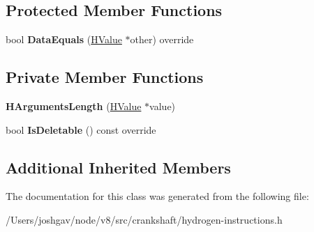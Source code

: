 \subsection*{Protected Member Functions}
\begin{DoxyCompactItemize}
\item 
bool {\bfseries Data\+Equals} (\hyperlink{classv8_1_1internal_1_1_h_value}{H\+Value} $\ast$other) override\hypertarget{classv8_1_1internal_1_1_h_arguments_length_a3ec1495f4092f8787b4fd0b66046f961}{}\label{classv8_1_1internal_1_1_h_arguments_length_a3ec1495f4092f8787b4fd0b66046f961}

\end{DoxyCompactItemize}
\subsection*{Private Member Functions}
\begin{DoxyCompactItemize}
\item 
{\bfseries H\+Arguments\+Length} (\hyperlink{classv8_1_1internal_1_1_h_value}{H\+Value} $\ast$value)\hypertarget{classv8_1_1internal_1_1_h_arguments_length_a23daaf91cbce537ffc330d3f7b3d9f16}{}\label{classv8_1_1internal_1_1_h_arguments_length_a23daaf91cbce537ffc330d3f7b3d9f16}

\item 
bool {\bfseries Is\+Deletable} () const  override\hypertarget{classv8_1_1internal_1_1_h_arguments_length_a14f4f5eeae74026e9e04ff2a73089a2f}{}\label{classv8_1_1internal_1_1_h_arguments_length_a14f4f5eeae74026e9e04ff2a73089a2f}

\end{DoxyCompactItemize}
\subsection*{Additional Inherited Members}


The documentation for this class was generated from the following file\+:\begin{DoxyCompactItemize}
\item 
/\+Users/joshgav/node/v8/src/crankshaft/hydrogen-\/instructions.\+h\end{DoxyCompactItemize}
